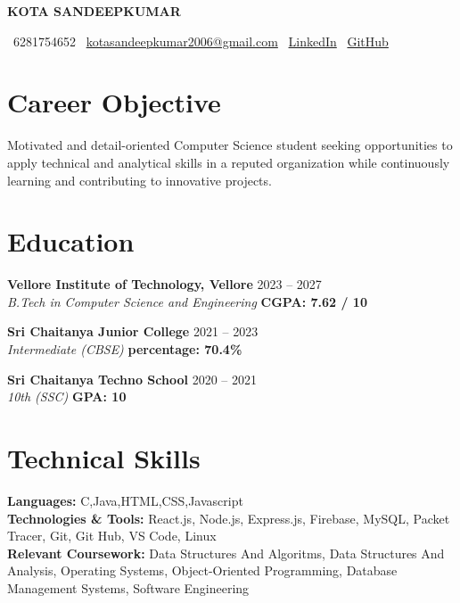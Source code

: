 \documentclass[letterpaper,11pt]{article}
\begin{document}
\begin{center}
\textbf{\Huge KOTA SANDEEPKUMAR} \\ \vspace{6pt}

\small
\faPhone\ 6281754652 \quad
\faEnvelope\ \href{mailto: kotasandeepkumar2006@gmail.com}{kotasandeepkumar2006@gmail.com} \quad
\faLinkedin\ \href{https://www.linkedin.com/in/kota-sandeep-kumar-a13b8a379/}{LinkedIn} \quad
\faGithub\ \href{https://github.com/sandeep2421-hub}{GitHub}
\end{center}

\section{Career Objective}
\small{Motivated and detail-oriented Computer Science student seeking opportunities to apply technical and analytical skills in a reputed organization while continuously learning and contributing to innovative projects.}
\section{Education}
\textbf{Vellore Institute of Technology, Vellore} \hfill 2023 -- 2027 \\
\textit{B.Tech in Computer Science and Engineering} \hfill \textbf{CGPA: 7.62 / 10}

\noindent\textbf{Sri Chaitanya Junior College} \hfill 2021 -- 2023 \\
\textit{Intermediate (CBSE)} \hfill \textbf{percentage: 70.4\%}

\noindent\textbf{Sri Chaitanya Techno School} \hfill 2020 -- 2021 \\
\textit{10th (SSC)} \hfill \textbf{GPA: 10}

\section{Technical Skills}

\textbf{Languages:} C,Java,HTML,CSS,Javascript \\
\textbf{Technologies \& Tools:} React.js, Node.js, Express.js, Firebase, MySQL, Packet Tracer, Git, Git Hub, VS Code, Linux \\
\textbf{Relevant Coursework:} Data Structures And Algoritms, Data Structures And Analysis, Operating Systems, Object-Oriented Programming, Database Management Systems, Software Engineering
 
\end{document}
